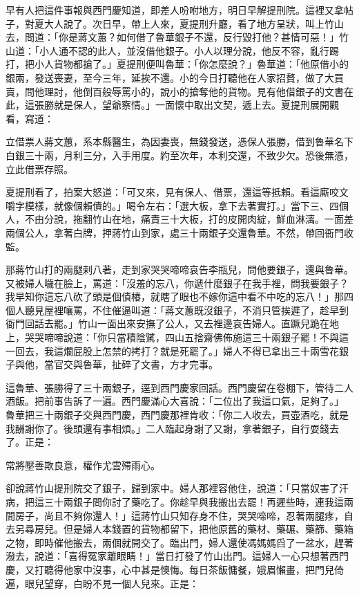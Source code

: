 \begin{showcontents}{}
早有人把這件事報與西門慶知道，即差人吩咐地方，明日早解提刑院。這裡又拿帖子，對夏大人說了。次日早，帶上人來，夏提刑升廳，看了地方呈狀，叫上竹山去，問道：「你是蔣文蕙？如何借了魯華銀子不還，反行毀打他？甚情可惡！」竹山道：「小人通不認的此人，並沒借他銀子。小人以理分說，他反不容，亂行踢打，把小人貨物都搶了。」夏提刑便叫魯華：「你怎麼說？」魯華道：「他原借小的銀兩，發送喪妻，至今三年，延挨不還。小的今日打聽他在人家招贅，做了大買賣，問他理討，他倒百般辱罵小的，說小的搶奪他的貨物。見有他借銀子的文書在此，這張勝就是保人，望爺察情。」一面懷中取出文契，遞上去。夏提刑展開觀看，寫道：

立借票人蔣文蕙，系本縣醫生，為因妻喪，無錢發送，憑保人張勝，借到魯華名下白銀三十兩，月利三分，入手用度。約至次年，本利交還，不致少欠。恐後無憑，立此借票存照。

夏提刑看了，拍案大怒道：「可又來，見有保人、借票，還這等抵賴。看這廝咬文嚼字模樣，就像個賴債的。」喝令左右：「選大板，拿下去著實打。」當下三、四個人，不由分說，拖翻竹山在地，痛責三十大板，打的皮開肉綻，鮮血淋漓。一面差兩個公人，拿著白牌，押蔣竹山到家，處三十兩銀子交還魯華。不然，帶回衙門收監。

那蔣竹山打的兩腿剌八著，走到家哭哭啼啼哀告李瓶兒，問他要銀子，還與魯華。又被婦人噦在臉上，罵道：「沒羞的忘八，你遞什麼銀子在我手裡，問我要銀子？我早知你這忘八砍了頭是個債椿，就瞎了眼也不嫁你這中看不中吃的忘八！」那四個人聽見屋裡嚷罵，不住催逼叫道：「蔣文蕙既沒銀子，不消只管挨遲了，趁早到衙門回話去罷。」竹山一面出來安撫了公人，又去裡邊哀告婦人。直蹶兒跪在地上，哭哭啼啼說道：「你只當積陰騭，四山五捨齋佛佈施這三十兩銀子罷！不與這一回去，我這爛屁股上怎禁的拷打？就是死罷了。」婦人不得已拿出三十兩雪花銀子與他，當官交與魯華，扯碎了文書，方才完事。

這魯華、張勝得了三十兩銀子，逕到西門慶家回話。西門慶留在卷棚下，管待二人酒飯。把前事告訴了一遍。西門慶滿心大喜說：「二位出了我這口氣，足夠了。」 魯華把三十兩銀子交與西門慶，西門慶那裡肯收：「你二人收去，買壺酒吃，就是我酬謝你了。後頭還有事相煩。」二人臨起身謝了又謝，拿著銀子，自行耍錢去了。正是：

常將壓善欺良意，權作尤雲殢雨心。

卻說蔣竹山提刑院交了銀子，歸到家中。婦人那裡容他住，說道：「只當奴害了汗病，把這三十兩銀子問你討了藥吃了。你趁早與我搬出去罷！再遲些時，連我這兩間房子，尚且不夠你還人！」這蔣竹山只知存身不住，哭哭啼啼，忍著兩腿疼，自去另尋房兒。但是婦人本錢置的貨物都留下，把他原舊的藥材、藥碾、藥篩、藥箱之物，即時催他搬去，兩個就開交了。臨出門，婦人還使馮媽媽舀了一盆水，趕著潑去，說道：「喜得冤家離眼睛！」當日打發了竹山出門。這婦人一心只想著西門慶，又打聽得他家中沒事，心中甚是懊悔。每日茶飯慵餐，娥眉懶畫，把門兒倚遍，眼兒望穿，白盼不見一個人兒來。正是：


\end{showcontents}
